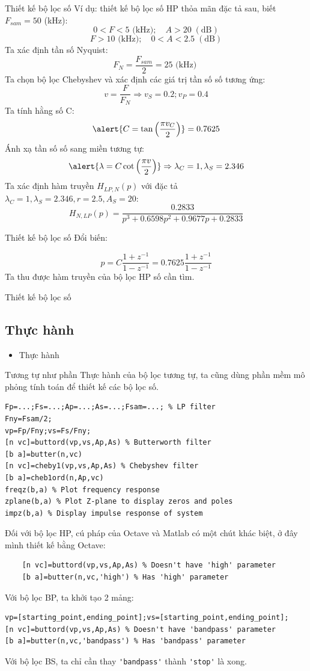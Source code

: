 \documentclass[8pt]{beamer}
\begin{document}
\begin{frame}{Thiết kế bộ lọc số}
Ví dụ: thiết kế bộ lọc số HP thỏa mãn đặc tả sau, biết $F_{sam}=50$ (kHz):
$$0<F<5\text{ (kHz)};\quad A>20\;(\text{dB})$$
$$F>10\text{ (kHz)};\quad 0<A<2.5\;(\text{dB})$$
Ta xác định tần số Nyquist: $$F_{N}=\frac{F_{sam}}{2}=25\text{ (kHz) }$$
Ta chọn bộ lọc Chebyshev và xác định các giá trị tần số số tương ứng:
$$v=\frac{F}{F_{N}}\Rightarrow v_{S}=0.2;v_{P}=0.4$$
Ta tính hằng số C: 
$$\alert{C=\tan{\left(\frac{\pi v_{C}}{2}\right)}}=0.7625$$
Ánh xạ tần số số sang miền tương tự:
$$\alert{\lambda=C\cot{\left(\frac{\pi v}{2}\right)}}\Rightarrow \lambda_{C}=1,\lambda_{S}=2.346$$
Ta xác định hàm truyền $H_{LP,N}(p)$ với đặc tả $\lambda_{C}=1,\lambda_{S}=2.346,r=2.5,A_{S}=20$:
$$H_{N,LP}(p)=\frac{0.2833}{p^3+0.6598p^2+0.9677p+0.2833}$$
\end{frame}
\begin{frame}{Thiết kế bộ lọc số}
Đổi biến:

	$$p=C\frac{1+z^{-1}}{1-z^{-1}}=0.7625\frac{1+z^{-1}}{1-z^{-1}}$$
Ta thu được hàm truyền của bộ lọc HP số cần tìm.
\end{frame}
\begin{frame}[fragile]{Thiết kế bộ lọc số}
\subsection{Thực hành}
\begin{itemize}
	\item Thực hành
\end{itemize}
Tương tự như phần Thực hành của bộ lọc tương tự, ta cũng dùng phần mềm mô phỏng tính toán để thiết kế các bộ lọc số.
\begin{verbatim}
Fp=...;Fs=...;Ap=...;As=...;Fsam=...; % LP filter
Fny=Fsam/2;
vp=Fp/Fny;vs=Fs/Fny;
[n vc]=buttord(vp,vs,Ap,As) % Butterworth filter
[b a]=butter(n,vc)
[n vc]=cheby1(vp,vs,Ap,As) % Chebyshev filter
[b a]=cheb1ord(n,Ap,vc)
freqz(b,a) % Plot frequency response
zplane(b,a) % Plot Z-plane to display zeros and poles
impz(b,a) % Display impulse response of system
\end{verbatim}
Đối với bộ lọc HP, cú pháp của Octave và Matlab có một chút khác biệt, ở đây mình thiết kế bằng Octave:
\begin{verbatim}
	[n vc]=buttord(vp,vs,Ap,As) % Doesn't have 'high' parameter
	[b a]=butter(n,vc,'high') % Has 'high' parameter
\end{verbatim}
Với bộ lọc BP, ta khởi tạo 2 mảng:
\begin{verbatim}
vp=[starting_point,ending_point];vs=[starting_point,ending_point];
[n vc]=buttord(vp,vs,Ap,As) % Doesn't have 'bandpass' parameter
[b a]=butter(n,vc,'bandpass') % Has 'bandpass' parameter
\end{verbatim}
Với bộ lọc BS, ta chỉ cần thay \verb|'bandpass'| thành \verb|'stop'| là xong.
\end{frame}
\end{document}
